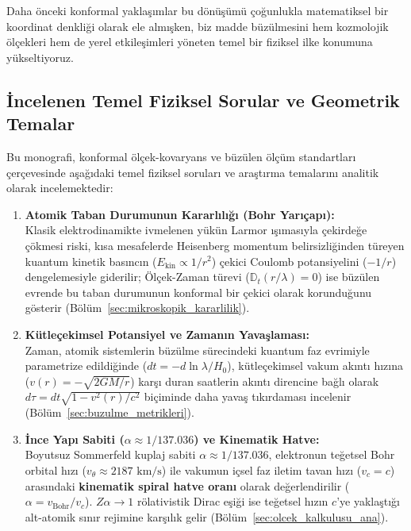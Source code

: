 Daha önceki konformal yaklaşımlar bu dönüşümü çoğunlukla matematiksel bir koordinat denkliği olarak ele almışken, biz madde büzülmesini hem kozmolojik ölçekleri hem de yerel etkileşimleri yöneten temel bir fiziksel ilke konumuna yükseltiyoruz.

\subsection{İncelenen Temel Fiziksel Sorular ve Geometrik Temalar}
\label{sec:temel_sorular}

Bu monografi, konformal ölçek-kovaryans ve büzülen ölçüm standartları çerçevesinde aşağıdaki temel fiziksel soruları ve araştırma temalarını analitik olarak incelemektedir:

\begin{enumerate}
      \item \textbf{Atomik Taban Durumunun Kararlılığı (Bohr Yarıçapı):} \\
            Klasik elektrodinamikte ivmelenen yükün Larmor ışımasıyla çekirdeğe çökmesi riski, kısa mesafelerde Heisenberg momentum belirsizliğinden türeyen kuantum kinetik basıncın ($E_{\mathrm{kin}} \propto 1/r^2$) çekici Coulomb potansiyelini ($-1/r$) dengelemesiyle giderilir; Ölçek-Zaman türevi ($\mathbb{D}_t(r/\lambda) = 0$) ise büzülen evrende bu taban durumunun konformal bir çekici olarak korunduğunu gösterir (Bölüm~\ref{sec:mikroskopik_kararlilik}).

      \item \textbf{Kütleçekimsel Potansiyel ve Zamanın Yavaşlaması:} \\
            Zaman, atomik sistemlerin büzülme sürecindeki kuantum faz evrimiyle parametrize edildiğinde ($dt = -d\ln\lambda/H_0$), kütleçekimsel vakum akıntı hızına ($v(r) = -\sqrt{2GM/r}$) karşı duran saatlerin akıntı direncine bağlı olarak $d\tau = dt\sqrt{1 - v^2(r)/c^2}$ biçiminde daha yavaş tıkırdaması incelenir (Bölüm~\ref{sec:buzulme_metrikleri}).

      \item \textbf{İnce Yapı Sabiti ($\alpha \approx 1/137.036$) ve Kinematik Hatve:} \\
            Boyutsuz Sommerfeld kuplaj sabiti $\alpha \approx 1/137.036$, elektronun teğetsel Bohr orbital hızı ($v_\theta \approx 2187\text{ km/s}$) ile vakumun içsel faz iletim tavan hızı ($v_c = c$) arasındaki \textbf{kinematik spiral hatve oranı} olarak değerlendirilir ($\alpha = v_{\mathrm{Bohr}} / v_c$). $Z\alpha \to 1$ rölativistik Dirac eşiği ise teğetsel hızın $c$'ye yaklaştığı alt-atomik sınır rejimine karşılık gelir (Bölüm~\ref{sec:olcek_kalkulusu_ana}).


\end{enumerate}
